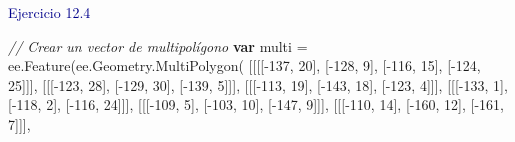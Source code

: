 \documentclass[
  12pt,
  letterpaper,
  twoside]{book}
\newenvironment{Shaded}{\begin{snugshade}}{\end{snugshade}}
\newcommand{\AttributeTok}[1]{\textcolor[rgb]{0.48,0.12,0.64}{#1}}
\newcommand{\CommentTok}[1]{\textcolor[rgb]{0.24,0.58,0.00}{\textit{#1}}}
\newcommand{\DecValTok}[1]{\textcolor[rgb]{0.28,0.53,0.93}{#1}}
\newcommand{\FunctionTok}[1]{\textcolor[rgb]{0.48,0.12,0.64}{#1}}
\newcommand{\KeywordTok}[1]{\textcolor[rgb]{0.00,0.00,0.00}{\textbf{#1}}}
\newcommand{\NormalTok}[1]{#1}
\newcommand{\OperatorTok}[1]{\textcolor[rgb]{0.00,0.00,0.00}{#1}}
\begin{document}
\textcolor{darkblue}{Ejercicio 12.4}

\begin{Shaded}
\begin{Highlighting}[]
\CommentTok{// Crear un vector de multipolígono}
\KeywordTok{var}\NormalTok{ multi }\OperatorTok{=}\NormalTok{ ee}\OperatorTok{.}\FunctionTok{Feature}\NormalTok{(ee}\OperatorTok{.}\AttributeTok{Geometry}\OperatorTok{.}\FunctionTok{MultiPolygon}\NormalTok{(}
\NormalTok{            [[[[}\OperatorTok{{-}}\DecValTok{137}\OperatorTok{,} \DecValTok{20}\NormalTok{]}\OperatorTok{,}
\NormalTok{               [}\OperatorTok{{-}}\DecValTok{128}\OperatorTok{,} \DecValTok{9}\NormalTok{]}\OperatorTok{,}
\NormalTok{               [}\OperatorTok{{-}}\DecValTok{116}\OperatorTok{,} \DecValTok{15}\NormalTok{]}\OperatorTok{,}
\NormalTok{               [}\OperatorTok{{-}}\DecValTok{124}\OperatorTok{,} \DecValTok{25}\NormalTok{]]]}\OperatorTok{,}
\NormalTok{             [[[}\OperatorTok{{-}}\DecValTok{123}\OperatorTok{,} \DecValTok{28}\NormalTok{]}\OperatorTok{,}
\NormalTok{               [}\OperatorTok{{-}}\DecValTok{129}\OperatorTok{,} \DecValTok{30}\NormalTok{]}\OperatorTok{,}
\NormalTok{               [}\OperatorTok{{-}}\DecValTok{139}\OperatorTok{,} \DecValTok{5}\NormalTok{]]]}\OperatorTok{,}
\NormalTok{             [[[}\OperatorTok{{-}}\DecValTok{113}\OperatorTok{,} \DecValTok{19}\NormalTok{]}\OperatorTok{,}
\NormalTok{               [}\OperatorTok{{-}}\DecValTok{143}\OperatorTok{,} \DecValTok{18}\NormalTok{]}\OperatorTok{,}
\NormalTok{               [}\OperatorTok{{-}}\DecValTok{123}\OperatorTok{,} \DecValTok{4}\NormalTok{]]]}\OperatorTok{,}
\NormalTok{             [[[}\OperatorTok{{-}}\DecValTok{133}\OperatorTok{,} \DecValTok{1}\NormalTok{]}\OperatorTok{,}
\NormalTok{               [}\OperatorTok{{-}}\DecValTok{118}\OperatorTok{,} \DecValTok{2}\NormalTok{]}\OperatorTok{,}
\NormalTok{               [}\OperatorTok{{-}}\DecValTok{116}\OperatorTok{,} \DecValTok{24}\NormalTok{]]]}\OperatorTok{,}
\NormalTok{             [[[}\OperatorTok{{-}}\DecValTok{109}\OperatorTok{,} \DecValTok{5}\NormalTok{]}\OperatorTok{,}
\NormalTok{               [}\OperatorTok{{-}}\DecValTok{103}\OperatorTok{,} \DecValTok{10}\NormalTok{]}\OperatorTok{,}
\NormalTok{               [}\OperatorTok{{-}}\DecValTok{147}\OperatorTok{,} \DecValTok{9}\NormalTok{]]]}\OperatorTok{,}
\NormalTok{             [[[}\OperatorTok{{-}}\DecValTok{110}\OperatorTok{,} \DecValTok{14}\NormalTok{]}\OperatorTok{,}
\NormalTok{               [}\OperatorTok{{-}}\DecValTok{160}\OperatorTok{,} \DecValTok{12}\NormalTok{]}\OperatorTok{,}
\NormalTok{               [}\OperatorTok{{-}}\DecValTok{161}\OperatorTok{,} \DecValTok{7}\NormalTok{]]]}\OperatorTok{,}

\end{Highlighting}
\end{Shaded}
\end{document}
